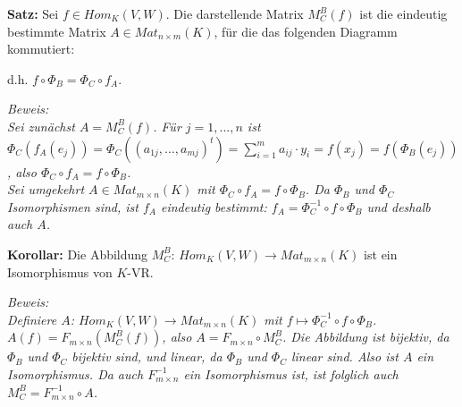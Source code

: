 \documentclass[11pt]{article}
\begin{document}
		\begin{framed}
			\textbf{Satz:} Sei $f\in Hom_K(V,W)$. Die darstellende Matrix $M_C^B(f)$ ist die eindeutig bestimmte Matrix $A\in 
			Mat_{n\times m}(K)$, für die das folgenden Diagramm kommutiert: \\
			\begin{center}\end{center}
			d.h. $f\circ \Phi_B=\Phi_C\circ f_A$.
		\end{framed}
		\textit{Beweis: \\
		Sei zunächst $A=M_C^B(f)$. Für $j=1,...,n$ ist $\Phi_C(f_A(e_j))=\Phi_C((a_{1j},...,a_{mj})^t)=\sum\limits_{i=1}^m 
		a_{ij}\cdot y_i=f(x_j)=f(\Phi_B(e_j))$, also $\Phi_C\circ f_A=f \circ \Phi_B$. \\
		Sei umgekehrt $A\in Mat_{m\times n}(K)$ mit $\Phi_C\circ f_A=f\circ\Phi_B$. Da $\Phi_B$ und $\Phi_C$ Isomorphismen 
		sind, ist $f_A$ eindeutig bestimmt: $f_A=\Phi_C^{-1}\circ f \circ \Phi_B$ und deshalb auch $A$.} \\
		
		\begin{framed}
			\textbf{Korollar:} Die Abbildung $M_C^B$: $Hom_K(V,W)\to Mat_{m\times n}(K)$ ist ein Isomorphismus von $K$-VR.
		\end{framed}
		\textit{Beweis: \\
		Definiere $A$: $Hom_K(V,W)\to Mat_{m\times n}(K)$ mit $f\mapsto \Phi_C^{-1}\circ f \circ \Phi_B$. $A(f)=F_{m\times n}
		(M_C^B(f))$, also $A=F_{m\times n}\circ M_C^B$. Die Abbildung ist bijektiv, da $\Phi_B$ und $\Phi_C$ bijektiv sind, 
		und linear, da $\Phi_B$ und $\Phi_C$ linear sind. Also ist $A$ ein Isomorphismus. Da auch $F_{m\times n}^{-1}$ ein 
		Isomorphismus ist, ist folglich auch $M_C^B=F_{m\times n}^{-1}\circ A$.} \\
		
\end{document}
